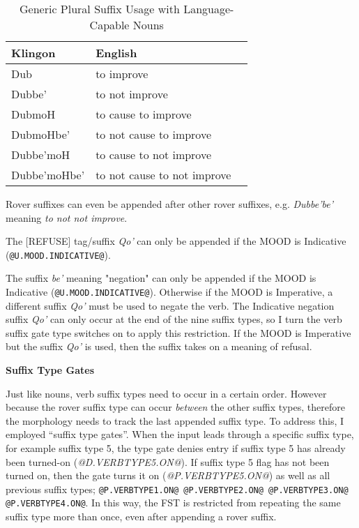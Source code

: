 \documentclass[11pt]{article}
\begin{document}
	\begin{table}[h]
	\begin{center}
	\begin{tabular}{lll}
	\toprule
	\bf Klingon & \bf English \\
	\midrule
	Dub & to improve \\
	Dubbe' & to not improve \\
	DubmoH & to cause to improve \\
	DubmoHbe' & to not cause to improve \\
	Dubbe'moH & to cause to not improve \\
	Dubbe'moHbe' & to not cause to not improve \\
	\bottomrule
	\end{tabular}
	\end{center}
	\caption{Generic Plural Suffix Usage with Language-Capable Nouns}
	\end{table}

Rover suffixes can even be appended after other rover suffixes, e.g. \textit{Dubbe'be'} meaning \textit{to not not improve}.

The [REFUSE] tag/suffix \textit{Qo'} can only be appended if the MOOD is Indicative (\texttt{@U.MOOD.INDICATIVE@}).

The suffix \textit{be'} meaning "negation" can only be appended if the MOOD is Indicative (\texttt{@U.MOOD.INDICATIVE@}). Otherwise if the MOOD is Imperative, a different suffix \textit{Qo'} must be used to negate the verb. The Indicative negation suffix \textit{Qo'} can only occur at the end of the nine suffix types, so I turn the verb suffix gate type switches on to apply this restriction. If the MOOD is Imperative but the suffix \textit{Qo'} is used, then the suffix takes on a meaning of refusal.

\textbf{Suffix Type Gates}

Just like nouns, verb suffix types need to occur in a certain order. However because the rover suffix type can occur \textit{between} the other suffix types, therefore the morphology needs to track the last appended suffix type. To address this, I employed ``suffix type gates''. When the input leads through a specific suffix type, for example suffix type 5, the type gate denies entry if suffix type 5 has already been turned-on (\textit{@D.VERBTYPE5.ON@}). If suffix type 5 flag has not been turned on, then the gate turns it on (\textit{@P.VERBTYPE5.ON@}) as well as all previous suffix types; \texttt{@P.VERBTYPE1.ON@ @P.VERBTYPE2.ON@ @P.VERBTYPE3.ON@ @P.VERBTYPE4.ON@}. In this way, the FST is restricted from repeating the same suffix type more than once, even after appending a rover suffix.
\end{document}
